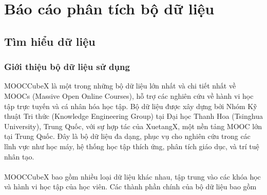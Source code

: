 \section{Báo cáo phân tích bộ dữ liệu}
\subsection{Tìm hiểu dữ liệu}
\subsubsection{Giới thiệu bộ dữ liệu sử dụng}
MOOCCubeX là một trong những bộ dữ liệu lớn nhất và chi tiết nhất về MOOCs (Massive Open Online Courses), hỗ trợ các nghiên cứu về hành vi học tập trực tuyến và cá nhân hóa học tập. Bộ dữ liệu được xây dựng bởi Nhóm Kỹ thuật Tri thức (Knowledge Engineering Group) tại Đại học Thanh Hoa (Tsinghua University), Trung Quốc, với sự hợp tác của XuetangX, một nền tảng MOOC lớn tại Trung Quốc. Đây là bộ dữ liệu đa dạng, phục vụ cho nghiên cứu trong các lĩnh vực như học máy, hệ thống học tập thích ứng, phân tích giáo dục, và trí tuệ nhân tạo.\\
\\
MOOCCubeX bao gồm nhiều loại dữ liệu khác nhau, tập trung vào các khóa học và hành vi học tập của học viên. Các thành phần chính của bộ dữ liệu bao gồm\\
